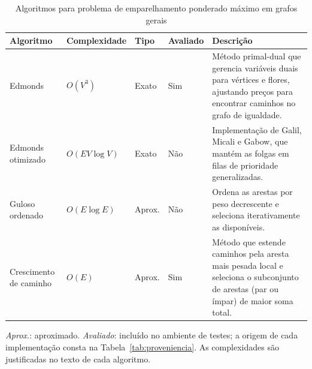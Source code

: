 \begin{table}[H]
    \centering
    \caption{Algoritmos para problema de emparelhamento ponderado máximo em grafos gerais}
    \label{tab:emp_pond_max_gerais}
    \renewcommand{\arraystretch}{1.2} %
    \footnotesize
    
    \begin{tabularx}{\textwidth}{@{} >{\raggedright\arraybackslash}p{2.8cm} l l l >{\raggedright\arraybackslash}X @{}}
        \toprule
        \textbf{Algoritmo} & \textbf{Complexidade} & \textbf{Tipo} & \textbf{Avaliado} & \textbf{Descrição} \\
        \midrule
        
        Edmonds & $O(V^3)$ & Exato & Sim & 
        Método primal-dual que gerencia variáveis duais para vértices e flores, ajustando preços para encontrar caminhos no grafo de igualdade. \\
        \addlinespace 

        Edmonds otimizado & $O(EV \log V)$ & Exato & Não & 
        Implementação de Galil, Micali e Gabow, que mantém as folgas em filas de prioridade generalizadas. \\
        \addlinespace 

        Guloso ordenado & $O(E \log E)$ & Aprox. & Não & 
        Ordena as arestas por peso decrescente e seleciona iterativamente as disponíveis. \\
        \addlinespace

        Crescimento de caminho & $O(E)$ & Aprox. & Sim & 
        Método que estende caminhos pela aresta mais pesada local e seleciona o subconjunto de arestas (par ou ímpar) de maior soma total. \\
        
        \bottomrule
    \end{tabularx}
    \par\smallskip
    {\raggedright\footnotesize \textit{Aprox.}: aproximado. \textit{Avaliado}: incluído no ambiente de testes; a origem de cada implementação consta na Tabela~\ref{tab:proveniencia}. As complexidades são justificadas no texto de cada algoritmo.\par}
\end{table}
